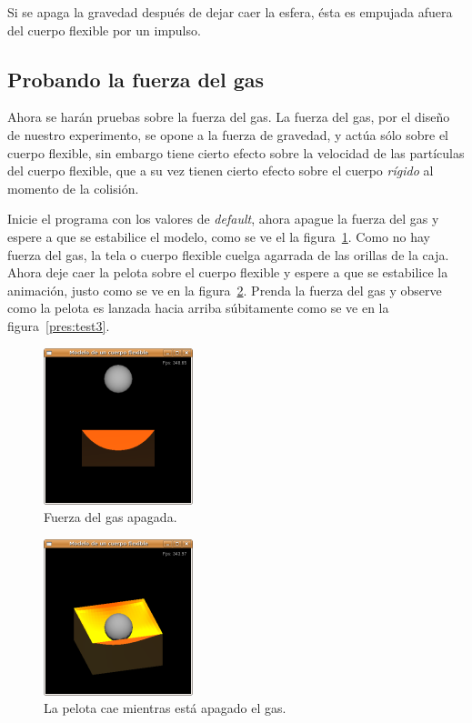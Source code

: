 Si se apaga la gravedad después de dejar caer la esfera, ésta es empujada afuera del cuerpo flexible por un impulso.

\subsection{Probando la fuerza del gas}
Ahora se harán pruebas sobre la fuerza del gas. La fuerza del gas, por el diseño de nuestro experimento, se opone a la fuerza de gravedad, y actúa sólo sobre el cuerpo flexible, sin embargo tiene cierto efecto sobre la velocidad de las partículas del cuerpo flexible, que a su vez tienen cierto efecto sobre el cuerpo \emph{rígido} al momento de la colisión.

Inicie el programa con los valores de \emph{\foreignlanguage{english}{default}}, ahora apague la fuerza del gas y espere a que se estabilice el modelo, como se ve el la figura~\ref{pres:test1}. Como no hay fuerza del gas, la tela o cuerpo flexible cuelga agarrada de las orillas de la caja. Ahora deje caer la pelota sobre el cuerpo flexible y espere a que se estabilice la animación, justo como se ve en la figura~\ref{pres:test2}. Prenda la fuerza del gas y observe como la pelota es lanzada hacia arriba súbitamente como se ve en la figura~\ref{pres:test3}.

\begin{figure}
 \centering
 \includegraphics[]{Img/modPres1}
 \caption[Ejecución con la fuerza del gas apagada]{Fuerza del gas apagada.}
 \label{pres:test1}
\end{figure}

\begin{figure}
 \centering
 \includegraphics[]{Img/modPres2}
 \caption[Ejecución con la esfera cayendo en ausencia de fuerza del gas]{La pelota cae mientras está apagado el gas.}
 \label{pres:test2}
\end{figure}

